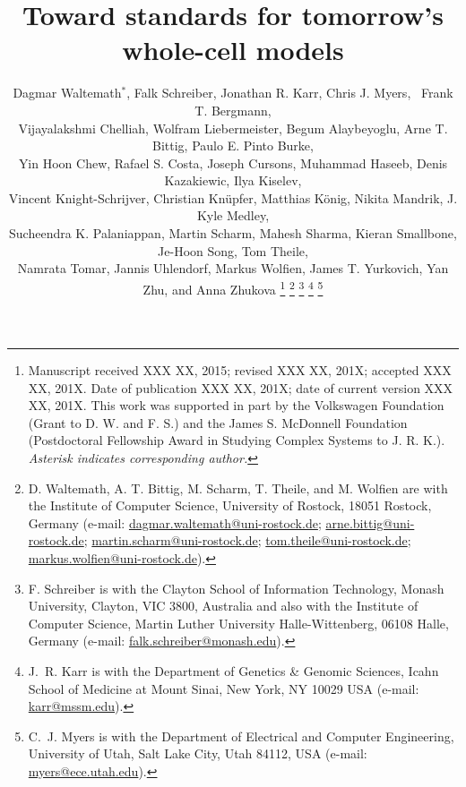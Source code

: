 \documentclass[journal,transmag]{IEEEtran}
\newcommand{\email}[1]{\href{mailto:#1}{#1}}
\begin{document}

\title{Toward standards for tomorrow's whole-cell models}

\author{
    Dagmar Waltemath$^*$,
    Falk Schreiber, 
    Jonathan R. Karr, 
    Chris J. Myers,~
    Frank T. Bergmann,\\
    Vijayalakshmi Chelliah,
    Wolfram Liebermeister,
    Begum Alaybeyoglu,
    Arne T. Bittig,
    Paulo E. Pinto Burke, \\
    Yin Hoon Chew,
    Rafael S. Costa,
    Joseph Cursons, 
    Muhammad Haseeb,
    Denis Kazakiewic,
    Ilya Kiselev,\\
    Vincent Knight-Schrijver,
    Christian Kn\"{u}pfer,
    Matthias K\"{o}nig,
    Nikita Mandrik,
    J. Kyle Medley,\\
    Sucheendra K. Palaniappan,
    Martin Scharm,
    Mahesh Sharma,
    Kieran Smallbone,
    Je-Hoon Song,
    Tom Theile,\\
    Namrata Tomar,
    Jannis Uhlendorf,
    Markus Wolfien,
    James T. Yurkovich, 
    Yan Zhu, and
    Anna Zhukova
    \thanks{
        Manuscript received XXX XX, 2015; revised XXX XX, 201X; accepted XXX XX, 201X. Date of publication XXX XX, 201X; date of current version XXX XX, 201X.
        This work was supported in part by the Volkswagen Foundation (Grant to D. W. and F. S.) and the James S. McDonnell Foundation (Postdoctoral Fellowship Award in Studying Complex Systems to J. R. K.).
        \textit{Asterisk indicates corresponding author.}
    }
    \thanks{D. Waltemath, A. T. Bittig, M. Scharm, T. Theile, and M. Wolfien are with the Institute of Computer Science, University of Rostock, 18051 Rostock, Germany (e-mail: \email{dagmar.waltemath@uni-rostock.de}; \email{arne.bittig@uni-rostock.de}; \email{martin.scharm@uni-rostock.de}; \email{tom.theile@uni-rostock.de}; \email{markus.wolfien@uni-rostock.de}).}
    \thanks{F. Schreiber is with the Clayton School of Information Technology, Monash University, Clayton, VIC 3800, Australia and also with the Institute of Computer Science, Martin Luther University Halle-Wittenberg, 06108 Halle, Germany (e-mail: \email{falk.schreiber@monash.edu}).}
    \thanks{J.~R. Karr is with the Department of Genetics \& Genomic Sciences, Icahn School of Medicine at Mount Sinai, New York, NY 10029 USA (e-mail: \email{karr@mssm.edu}).}
    \thanks{C.~J. Myers is with the Department of Electrical and Computer Engineering, University of Utah, Salt Lake City, Utah 84112, USA (e-mail: \email{myers@ece.utah.edu}).}
}
\end{document}
